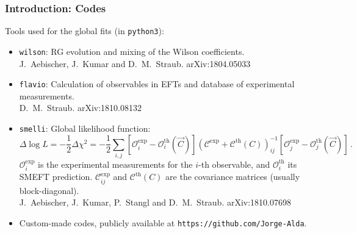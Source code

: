 \documentclass[mathserif, 10pt, dvipsnames]{beamer}
\newcommand\colorcite[1]{{\scriptsize\color{unizarblue}#1}}
\begin{document}
\begin{frame}\frametitle{Introduction: Codes}
    Tools used for the global fits (in \texttt{python3}):
    \begin{itemize}
\item \texttt{wilson}: RG evolution and mixing of the Wilson coefficients.\\ \colorcite{J.~Aebischer, J.~Kumar and D.~M.~Straub. arXiv:1804.05033}
\item \texttt{flavio}: Calculation of observables in EFTs and database of experimental measurements. \\ \colorcite{D.~M.~Straub. arXiv:1810.08132}
\item \texttt{smelli}: Global likelihood function:
              {\small$$\Delta \log L = -\frac{1}{2}\Delta\chi^2 = -\frac{1}{2}\sum_{i,j} [\mathcal{O}_i^\mathrm{exp} - \mathcal{O}^\mathrm{th}_i(\vec{C})] (\mathcal{C}^\mathrm{exp}+\mathcal{C}^\mathrm{th}(C))^{-1}_{ij} [\mathcal{O}_j^\mathrm{exp} - \mathcal{O}^\mathrm{th}_j(\vec{C})]\,. $$} %
$\mathcal{O}_i^\mathrm{exp}$ is the experimental measurements for the $i$-th observable, and $\mathcal{O}_i^\mathrm{th}$ its SMEFT prediction. $\mathcal{C}_{ij}^\mathrm{exp}$ and $\mathcal{C}^\mathrm{th}(C)$ are the covariance matrices (usually block-diagonal).%
\\ \colorcite{J.~Aebischer, J.~Kumar, P.~Stangl and D.~M.~Straub. arXiv:1810.07698}
        \item Custom-made codes, publicly available at \texttt{https://github.com/Jorge-Alda}.
    \end{itemize}
\end{frame}
\end{document}
